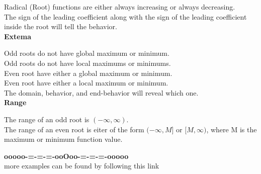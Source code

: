 \documentclass{ximera}
\begin{document}
Radical (Root) functions are either always increasing or always decreasing. \\


The sign of the leading coefficient along with the sign of the leading coefficient inside the root will tell the behavior. \\







\textbf{\textcolor{blue!55!black}{Extema}}



Odd roots do not have global maximum or minimum.\\

Odd roots do not have local maximums or minimums.\\




Even root have either a global maximum or minimum.\\

Even root have either a local maximum or minimum.\\


The domain, behavior, and end-behavior will reveal which one. \\










\textbf{\textcolor{blue!55!black}{Range}}



The range of an odd root is $(-\infty, \infty)$. \\



The range of an even root is eiter of the form $(-\infty, M]$ or $[M, \infty)$, where M is the maximum or minimum function value.


































\begin{center}
\textbf{\textcolor{green!50!black}{ooooo-=-=-=-ooOoo-=-=-=-ooooo}} \\

more examples can be found by following this link\\ 

\end{center}
\end{document}
